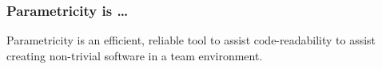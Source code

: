 \begin{frame}[fragile]
\frametitle{Parametricity is \ldots}
\begin{center}
Parametricity is an efficient, reliable tool to assist code-readability to assist creating non-trivial software in a team environment.
\end{center}
\end{frame}